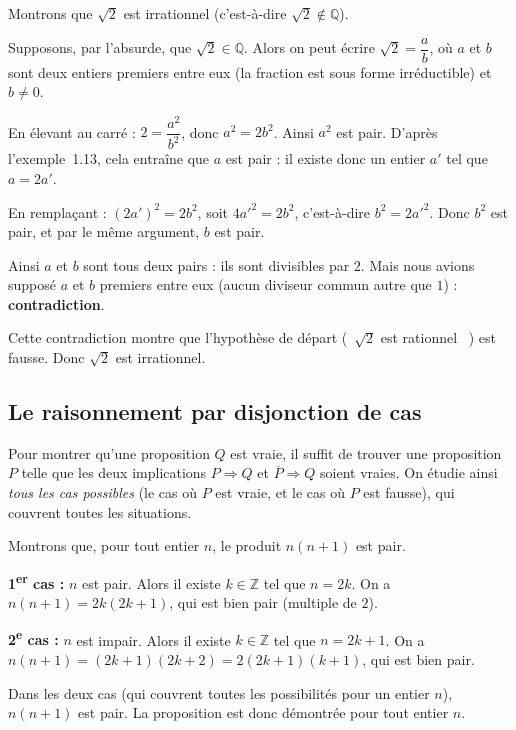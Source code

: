 \documentclass[a4paper,12pt,openany]{book}
\providecommand{\og}{\guillemotleft~}
\providecommand{\fg}{\ifhmode~\fi\guillemotright}
\providecommand{\up}[1]{\textsuperscript{#1}}
\begin{document}
\begin{exemple}
Montrons que $\sqrt{2}$ est irrationnel (c'est-à-dire $\sqrt2 \notin
\mathbb{Q}$).

Supposons, par l'absurde, que $\sqrt{2}\in\mathbb{Q}$. Alors on peut écrire
$\sqrt2 = \dfrac{a}{b}$, où $a$ et $b$ sont deux entiers premiers entre eux
(la fraction est sous forme irréductible) et $b\neq 0$.

En élevant au carré : $2=\dfrac{a^2}{b^2}$, donc $a^2=2b^2$. Ainsi $a^2$ est
pair. D'après l'exemple~1.13, cela entraîne que $a$ est pair : il existe donc
un entier $a'$ tel que $a=2a'$.

En remplaçant : $(2a')^2=2b^2$, soit $4a'^2=2b^2$, c'est-à-dire
$b^2=2a'^2$. Donc $b^2$ est pair, et par le même argument, $b$ est pair.

Ainsi $a$ et $b$ sont tous deux pairs : ils sont divisibles par $2$. Mais nous
avions supposé $a$ et $b$ premiers entre eux (aucun diviseur commun autre que
$1$) : \textbf{contradiction}.

Cette contradiction montre que l'hypothèse de départ (\og $\sqrt2$ est
rationnel \fg) est fausse. Donc $\sqrt2$ est irrationnel.
\end{exemple}

\subsection{Le raisonnement par disjonction de cas}

\begin{proposition}[Principe]
Pour montrer qu'une proposition $Q$ est vraie, il suffit de trouver une
proposition $P$ telle que les deux implications $P\Rightarrow Q$ et
$\overline{P}\Rightarrow Q$ soient vraies. On étudie ainsi \emph{tous les cas
possibles} (le cas où $P$ est vraie, et le cas où $P$ est fausse), qui
couvrent toutes les situations.
\end{proposition}

\begin{exemple}
Montrons que, pour tout entier $n$, le produit $n(n+1)$ est pair.

\textbf{1\up{er} cas :} $n$ est pair. Alors il existe $k\in\mathbb{Z}$ tel que
$n=2k$. On a $n(n+1) = 2k(2k+1)$, qui est bien pair (multiple de $2$).

\textbf{2\up{e} cas :} $n$ est impair. Alors il existe $k\in\mathbb{Z}$ tel que
$n=2k+1$. On a $n(n+1) = (2k+1)(2k+2) = 2(2k+1)(k+1)$, qui est bien pair.

Dans les deux cas (qui couvrent toutes les possibilités pour un entier $n$),
$n(n+1)$ est pair. La proposition est donc démontrée pour tout entier $n$.
\end{exemple}
\end{document}
